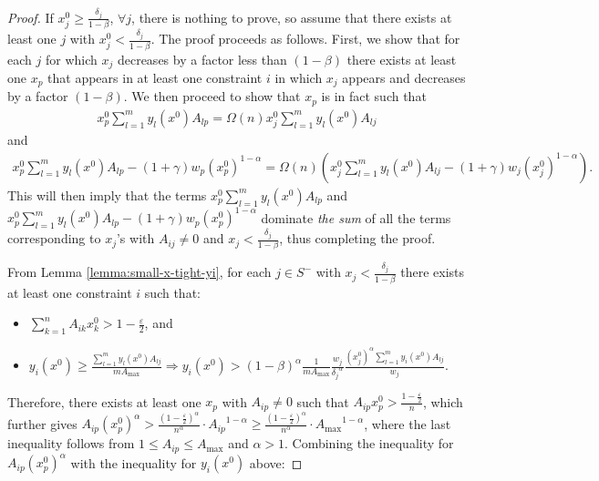 \documentclass[11pt]{article}
\begin{document}
\begin{proof}
If $x_j^0 \geq \frac{\delta_j}{1-\beta}$, $\forall j$, there is nothing to prove, so assume that there exists at least one $j$ with $x_j^0 < \frac{\delta_j}{1-\beta}$. 
The proof proceeds as follows. First, we show that for each $j$ for which $x_j$ decreases by a factor less than $(1-\beta)$ there exists at least one $x_p$ that appears in at least one constraint $i$ in which $x_j$ appears and decreases by a factor $(1-\beta)$. We then proceed to show that $x_p$ is in fact such that 
\begin{align*}x_p^0\sum_{l=1}^m y_l(x^0)A_{lp} = \Omega(n)x_j^0\sum_{l=1}^m y_l(x^0)A_{lj}
\end{align*}
and 
\begin{align*}x_p^0\sum_{l=1}^m y_l(x^0)A_{lp} - (1+\gamma)w_p(x_p^0)^{1-\alpha}= \Omega(n) \left(x_j^0\sum_{l=1}^m y_l(x^0)A_{lj} - (1+\gamma)w_j(x_j^0)^{1-\alpha}\right).
\end{align*}
This will then imply that the terms $x_p^0\sum_{l=1}^m y_l(x^0)A_{lp}$ and $x_p^0\sum_{l=1}^m y_l(x^0)A_{lp} - (1+\gamma)w_p(x_p^0)^{1-\alpha}$ dominate \emph{the sum} of all the terms corresponding to $x_j$'s with $A_{ij}\neq 0$ and $x_j<\frac{\delta_j}{1-\beta}$, thus completing the proof.

From Lemma \ref{lemma:small-x-tight-yi}, for each $j\in S^-$ with $x_j < \frac{\delta_j}{1-\beta}$ there exists at least one constraint $i$ such that:
\begin{itemize}
\item $\sum_{k=1}^n A_{ik}x_k^0 > 1 - \frac{\varepsilon}{2}$, and
\item $y_i(x^0) \geq \frac{\sum_{l=1}^m y_l(x^0)A_{lj}}{mA_{\max}} \Rightarrow y_i(x^0) > (1-\beta)^\alpha\frac{1}{mA_{\max}}\frac{w_j}{{\delta_j}^{\alpha}}\frac{(x_j^0)^{\alpha}\sum_{l=1}^m y_i(x^0)A_{lj}}{w_j}$.
\end{itemize}
Therefore, there exists at least one $x_p$ with $A_{ip}\neq 0$ such that $A_{ip}x_p^0>\frac{1-\frac{\varepsilon}{2}}{n}$, which further gives $A_{ip}(x_p^0)^{\alpha}>\frac{(1-\frac{\varepsilon}{2})^{\alpha}}{n^\alpha}\cdot {A_{ip}}^{1-\alpha}\geq\frac{(1-\frac{\varepsilon}{2})^{\alpha}}{n^\alpha}\cdot {A_{\max}}^{1-\alpha}$, where the last inequality follows from $1\leq A_{ip}\leq A_{\max}$ and $\alpha>1$. Combining the inequality for $A_{ip}(x_p^0)^{\alpha}$ with the inequality for $y_i(x^0)$ above:


\end{proof}
\end{document}
